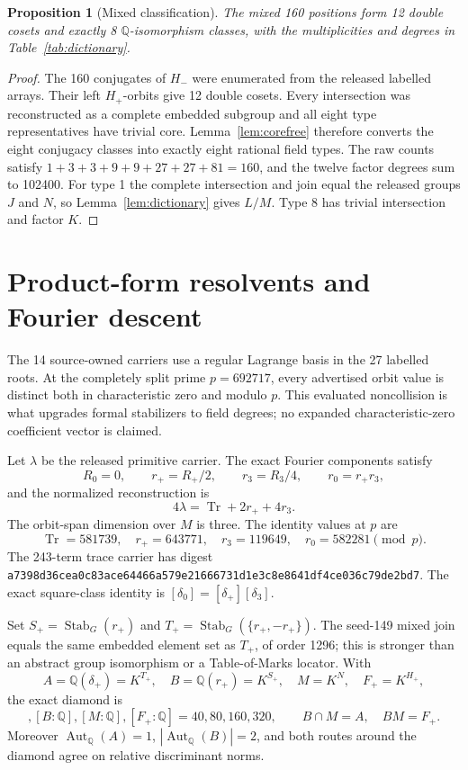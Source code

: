 \documentclass[11pt]{article}
\newtheorem{proposition}[theorem]{Proposition}
\newcommand{\Q}{\mathbb Q}
\newcommand{\Stab}{\operatorname{Stab}}
\newcommand{\sha}[1]{\texttt{\scriptsize #1}}
\begin{document}
\begin{proposition}[Mixed classification]\label{prop:mixed}
The mixed 160 positions form 12 double cosets and exactly 8 $\Q$-isomorphism classes, with
the multiplicities and degrees in Table~\ref{tab:dictionary}.
\end{proposition}
\begin{proof}
The 160 conjugates of $H_-$ were enumerated from the released labelled arrays.  Their left
$H_+$-orbits give 12 double cosets.  Every intersection was reconstructed as a complete
embedded subgroup and all eight type representatives have trivial core.  Lemma~\ref{lem:corefree}
therefore converts the eight conjugacy classes into exactly eight rational field types.  The raw
counts satisfy $1+3+3+9+9+27+27+81=160$, and the twelve factor degrees sum to 102400.
For type 1 the complete intersection and join equal the released groups $J$ and $N$, so
Lemma~\ref{lem:dictionary} gives $L/M$.  Type 8 has trivial intersection and factor $K$.
\end{proof}

\section{Product-form resolvents and Fourier descent}
The 14 source-owned carriers use a regular Lagrange basis in the 27 labelled roots.  At the
completely split prime $p=692717$, every advertised orbit value is distinct both in characteristic
zero and modulo $p$.  This evaluated noncollision is what upgrades formal stabilizers to field
degrees; no expanded characteristic-zero coefficient vector is claimed.

Let $\lambda$ be the released primitive carrier.  The exact Fourier components satisfy
\begin{equation}
 R_0=0,\qquad r_+=R_+/2,\qquad r_3=R_3/4,\qquad r_0=r_+r_3,
\end{equation}
and the normalized reconstruction is
\begin{equation}
 4\lambda=\operatorname{Tr}+2r_++4r_3.
\label{eq:fourier}
\end{equation}
The orbit-span dimension over $M$ is three.  The identity values at $p$ are
\[
\operatorname{Tr}=581739,\quad r_+=643771,\quad r_3=119649,
\quad r_0=582281\pmod p.
\]
The 243-term trace carrier has digest \sha{a7398d36cea0c83ace64466a579e21666731d1e3c8e8641df4ce036c79de2bd7}.
The exact square-class identity is $[\delta_0]=[\delta_+][\delta_3]$.

Set $S_+=\Stab_G(r_+)$ and $T_+=\Stab_G(\{r_+,-r_+\})$.  The seed-149 mixed join equals
the same embedded element set as $T_+$, of order 1296; this is stronger than an abstract group
isomorphism or a Table-of-Marks locator.  With
\[
 A=\Q(\delta_+)=K^{T_+},\quad B=\Q(r_+)=K^{S_+},\quad M=K^N,\quad F_+=K^{H_+},
\]
the exact diamond is
\begin{equation}
 [A:\Q],[B:\Q],[M:\Q],[F_+:\Q]=40,80,160,320,
 \qquad B\cap M=A,\quad BM=F_+.
\end{equation}
Moreover $\operatorname{Aut}_\Q(A)=1$, $|\operatorname{Aut}_\Q(B)|=2$, and both routes around
the diamond agree on relative discriminant norms.
\end{document}
